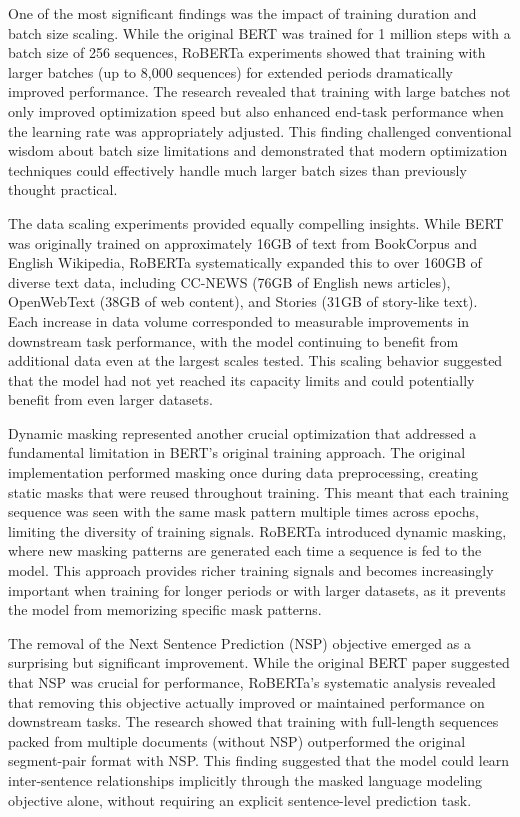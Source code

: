\documentclass[
  titlepage]{article}
\begin{document}
One of the most significant findings was the impact of training duration
and batch size scaling. While the original BERT was trained for 1
million steps with a batch size of 256 sequences, RoBERTa experiments
showed that training with larger batches (up to 8,000 sequences) for
extended periods dramatically improved performance. The research
revealed that training with large batches not only improved optimization
speed but also enhanced end-task performance when the learning rate was
appropriately adjusted. This finding challenged conventional wisdom
about batch size limitations and demonstrated that modern optimization
techniques could effectively handle much larger batch sizes than
previously thought practical.

The data scaling experiments provided equally compelling insights. While
BERT was originally trained on approximately 16GB of text from
BookCorpus and English Wikipedia, RoBERTa systematically expanded this
to over 160GB of diverse text data, including CC-NEWS (76GB of English
news articles), OpenWebText (38GB of web content), and Stories (31GB of
story-like text). Each increase in data volume corresponded to
measurable improvements in downstream task performance, with the model
continuing to benefit from additional data even at the largest scales
tested. This scaling behavior suggested that the model had not yet
reached its capacity limits and could potentially benefit from even
larger datasets.

Dynamic masking represented another crucial optimization that addressed
a fundamental limitation in BERT's original training approach. The
original implementation performed masking once during data
preprocessing, creating static masks that were reused throughout
training. This meant that each training sequence was seen with the same
mask pattern multiple times across epochs, limiting the diversity of
training signals. RoBERTa introduced dynamic masking, where new masking
patterns are generated each time a sequence is fed to the model. This
approach provides richer training signals and becomes increasingly
important when training for longer periods or with larger datasets, as
it prevents the model from memorizing specific mask patterns.

The removal of the Next Sentence Prediction (NSP) objective emerged as a
surprising but significant improvement. While the original BERT paper
suggested that NSP was crucial for performance, RoBERTa's systematic
analysis revealed that removing this objective actually improved or
maintained performance on downstream tasks. The research showed that
training with full-length sequences packed from multiple documents
(without NSP) outperformed the original segment-pair format with NSP.
This finding suggested that the model could learn inter-sentence
relationships implicitly through the masked language modeling objective
alone, without requiring an explicit sentence-level prediction task.
\end{document}
